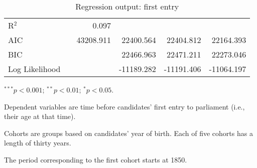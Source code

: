 \begin{table}
\begin{center}
{\begin{threeparttable}
\begin{tabular}{l D{.}{.}{4.6} D{.}{.}{5.4} D{.}{.}{6.6} D{.}{.}{6.6} D{.}{.}{6.6}}
R$^2$                &                        & 0.097                  &                        &                         &                         \\
AIC                  &                        & 43208.911              & 22400.564              & 22404.812               & 22164.393               \\
BIC                  &                        &                        & 22466.963              & 22471.211               & 22273.046               \\
Log Likelihood       &                        &                        & -11189.282             & -11191.406              & -11064.197              \\
\bottomrule
\end{tabular}
\begin{tablenotes}[flushleft]
\scriptsize{
\item $^{***}p<0.001$; $^{**}p<0.01$; $^{*}p<0.05$.
\item Dependent variables are time before candidates' first entry to parliament (i.e., their age at that time).
\item Cohorts are groups based on candidates' year of birth. Each of five cohorts has a length of thirty years. 
\item The period corresponding to the first cohort starts at 1850.}
\end{tablenotes}
\end{threeparttable}
}
\caption{Regression output: first entry}
\label{table:tabreg.win}
\end{center}
\end{table}

